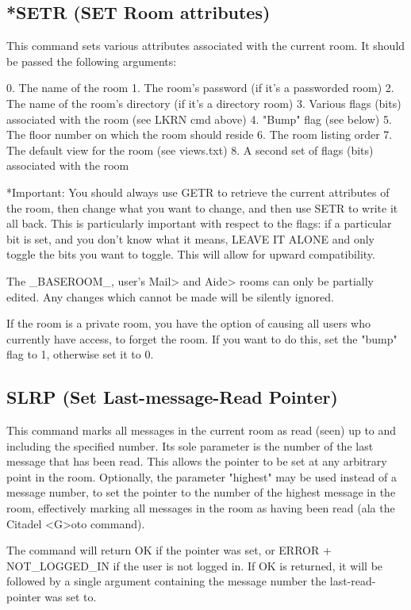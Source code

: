 \subsection{*SETR (SET Room attributes)}

 This command sets various attributes associated with the current room.  It
should be passed the following arguments:

 0. The name of the room
 1. The room's password (if it's a passworded room)
 2. The name of the room's directory (if it's a directory room)
 3. Various flags (bits) associated with the room (see LKRN cmd above)
 4. "Bump" flag (see below)
 5. The floor number on which the room should reside
 6. The room listing order
 7. The default view for the room (see views.txt)
 8. A second set of flags (bits) associated with the room

 *Important: You should always use GETR to retrieve the current attributes of
the room, then change what you want to change, and then use SETR to write it
all back.  This is particularly important with respect to the flags: if a
particular bit is set, and you don't know what it means, LEAVE IT ALONE and
only toggle the bits you want to toggle.  This will allow for upward
compatibility.

 The _BASEROOM_, user's Mail> and Aide> rooms can only be partially edited.
Any changes which cannot be made will be silently ignored.

 If the room is a private room, you have the option of causing all users who
currently have access, to forget the room.  If you want to do this, set the
"bump" flag to 1, otherwise set it to 0.



\subsection{SLRP (Set Last-message-Read Pointer)}

 This command marks all messages in the current room as read (seen) up to and
including the specified number.  Its sole parameter is the number of the last
message that has been read.  This allows the pointer to be set at any
arbitrary point in the room.  Optionally, the parameter "highest" may be used
instead of a message number, to set the pointer to the number of the highest
message in the room, effectively marking all messages in the room as having
been read (ala the Citadel <G>oto command).

 The command will return OK if the pointer was set, or ERROR + NOT_LOGGED_IN
if the user is not logged in.  If OK is returned, it will be followed by a
single argument containing the message number the last-read-pointer was set to.



